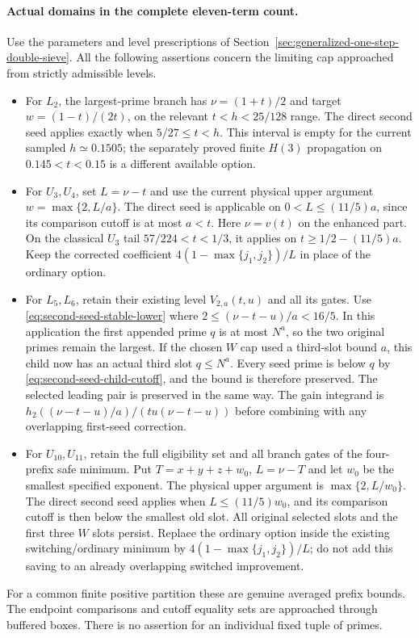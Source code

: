 \documentclass[11pt]{article}
\begin{document}
\paragraph{Actual domains in the complete eleven-term count.}
Use the parameters and level prescriptions of
Section~\ref{sec:generalized-one-step-double-sieve}.  All the
following assertions concern the limiting cap approached from
strictly admissible levels.
\begin{itemize}
\item For $L_2$, the largest-prime branch has
$\nu=(1+t)/2$ and target $w=(1-t)/(2t)$, on the relevant
$t<h<25/128$ range.  The direct second seed applies exactly when
$5/27\le t<h$.  This interval is empty for the current sampled
$h\simeq0.1505$; the separately proved finite $H(3)$ propagation
on $0.145<t<0.15$ is a different available option.
\item For $U_3,U_4$, set $L=\nu-t$ and use the current physical
upper argument $w=\max\{2,L/a\}$.  The direct seed is applicable
on $0<L\le(11/5)a$, since its comparison cutoff is at most $a<t$.
Here $\nu=v(t)$ on the enhanced part.  On the classical $U_3$
tail $57/224<t<1/3$, it applies on
$t\ge1/2-(11/5)a$.  Keep the corrected coefficient
$4(1-\max\{j_1,j_2\})/L$ in place of the ordinary option.
\item For $L_5,L_6$, retain their existing level $V_{2,a}(t,u)$
and all its gates.  Use \eqref{eq:second-seed-stable-lower} where
$2\le(\nu-t-u)/a<16/5$.  In this application the first appended
prime $q$ is at most $N^a$, so the two original primes remain the
largest.  If the chosen $W$ cap used a third-slot bound $a$, this
child now has an actual third slot $q\le N^a$.  Every seed prime
is below $q$ by \eqref{eq:second-seed-child-cutoff}, and the bound
is therefore preserved.  The selected leading pair is preserved
in the same way.  The gain integrand is
$h_2((\nu-t-u)/a)/(tu(\nu-t-u))$ before combining with any
overlapping first-seed correction.
\item For $U_{10},U_{11}$, retain the full eligibility set and
all branch gates of the four-prefix safe minimum.  Put
$T=x+y+z+w_0$, $L=\nu-T$ and let $w_0$ be the smallest specified
exponent.  The physical upper argument is
$\max\{2,L/w_0\}$.  The direct second seed applies when
$L\le(11/5)w_0$, and its comparison cutoff is then below the
smallest old slot.  All original selected slots and the first
three $W$ slots persist.  Replace the ordinary option inside the
existing switching/ordinary minimum by
$4(1-\max\{j_1,j_2\})/L$; do not add this saving to an already
overlapping switched improvement.
\end{itemize}
For a common finite positive partition these are genuine averaged
prefix bounds.  The endpoint comparisons and cutoff equality sets
are approached through buffered boxes.  There is no assertion for
an individual fixed tuple of primes.
\end{document}
